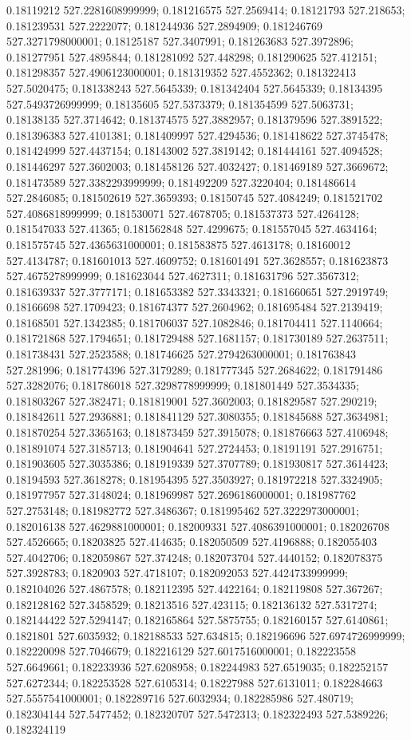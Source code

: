0.18119212 527.2281608999999; 0.181216575 527.2569414; 0.18121793 527.218653; 0.181239531 527.2222077; 0.181244936 527.2894909; 0.181246769 527.3271798000001; 0.18125187 527.3407991; 0.181263683 527.3972896; 0.181277951 527.4895844; 0.181281092 527.448298; 0.181290625 527.412151; 0.181298357 527.4906123000001; 0.181319352 527.4552362; 0.181322413 527.5020475; 0.181338243 527.5645339; 0.181342404 527.5645339; 0.18134395 527.5493726999999; 0.18135605 527.5373379; 0.181354599 527.5063731; 0.18138135 527.3714642; 0.181374575 527.3882957; 0.181379596 527.3891522; 0.181396383 527.4101381; 0.181409997 527.4294536; 0.181418622 527.3745478; 0.181424999 527.4437154; 0.18143002 527.3819142; 0.181444161 527.4094528; 0.181446297 527.3602003; 0.181458126 527.4032427; 0.181469189 527.3669672; 0.181473589 527.3382293999999; 0.181492209 527.3220404; 0.181486614 527.2846085; 0.181502619 527.3659393; 0.18150745 527.4084249; 0.181521702 527.4086818999999; 0.181530071 527.4678705; 0.181537373 527.4264128; 0.181547033 527.41365; 0.181562848 527.4299675; 0.181557045 527.4634164; 0.181575745 527.4365631000001; 0.181583875 527.4613178; 0.18160012 527.4134787; 0.181601013 527.4609752; 0.181601491 527.3628557; 0.181623873 527.4675278999999; 0.181623044 527.4627311; 0.181631796 527.3567312; 0.181639337 527.3777171; 0.181653382 527.3343321; 0.181660651 527.2919749; 0.18166698 527.1709423; 0.181674377 527.2604962; 0.181695484 527.2139419; 0.18168501 527.1342385; 0.181706037 527.1082846; 0.181704411 527.1140664; 0.181721868 527.1794651; 0.181729488 527.1681157; 0.181730189 527.2637511; 0.181738431 527.2523588; 0.181746625 527.2794263000001; 0.181763843 527.281996; 0.181774396 527.3179289; 0.181777345 527.2684622; 0.181791486 527.3282076; 0.181786018 527.3298778999999; 0.181801449 527.3534335; 0.181803267 527.382471; 0.181819001 527.3602003; 0.181829587 527.290219; 0.181842611 527.2936881; 0.181841129 527.3080355; 0.181845688 527.3634981; 0.181870254 527.3365163; 0.181873459 527.3915078; 0.181876663 527.4106948; 0.181891074 527.3185713; 0.181904641 527.2724453; 0.18191191 527.2916751; 0.181903605 527.3035386; 0.181919339 527.3707789; 0.181930817 527.3614423; 0.18194593 527.3618278; 0.181954395 527.3503927; 0.181972218 527.3324905; 0.181977957 527.3148024; 0.181969987 527.2696186000001; 0.181987762 527.2753148; 0.181982772 527.3486367; 0.181995462 527.3222973000001; 0.182016138 527.4629881000001; 0.182009331 527.4086391000001; 0.182026708 527.4526665; 0.18203825 527.414635; 0.182050509 527.4196888; 0.182055403 527.4042706; 0.182059867 527.374248; 0.182073704 527.4440152; 0.182078375 527.3928783; 0.1820903 527.4718107; 0.182092053 527.4424733999999; 0.182104026 527.4867578; 0.182112395 527.4422164; 0.182119808 527.367267; 0.182128162 527.3458529; 0.18213516 527.423115; 0.182136132 527.5317274; 0.182144422 527.5294147; 0.182165864 527.5875755; 0.182160157 527.6140861; 0.1821801 527.6035932; 0.182188533 527.634815; 0.182196696 527.6974726999999; 0.182220098 527.7046679; 0.182216129 527.6017516000001; 0.182223558 527.6649661; 0.182233936 527.6208958; 0.182244983 527.6519035; 0.182252157 527.6272344; 0.182253528 527.6105314; 0.18227988 527.6131011; 0.182284663 527.5557541000001; 0.182289716 527.6032934; 0.182285986 527.480719; 0.182304144 527.5477452; 0.182320707 527.5472313; 0.182322493 527.5389226; 0.182324119 